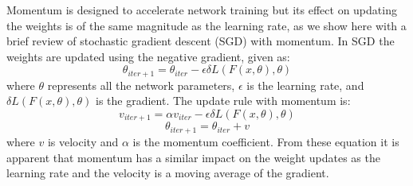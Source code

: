 \documentclass{article} %
\begin{document}
Momentum is designed to accelerate network training but its effect on updating the weights is of the same magnitude as the learning rate, as we show here with a brief review of stochastic gradient descent (SGD) with momentum.
In SGD the weights are updated using the negative gradient, given as:
\begin{equation}
\theta_{iter+1} = \theta_{iter} - \epsilon \delta L(F(x,\theta), \theta)
\end{equation}
where $\theta$ represents all the network parameters, $\epsilon$ is the learning rate, and $\delta L(F(x,\theta), \theta)$ is the gradient.  The update rule with momentum is:
\begin{equation}
v_{iter+1} = \alpha v_{iter} - \epsilon \delta L(F(x,\theta), \theta)
\end{equation}
\begin{equation}
\theta_{iter+1} = \theta_{iter} + v
\end{equation}
where $v$ is velocity and $\alpha$ is the momentum coefficient.  From these equation it is apparent that momentum has a similar impact on the weight updates as the learning rate and the velocity is a moving average of the gradient.  
\end{document}
